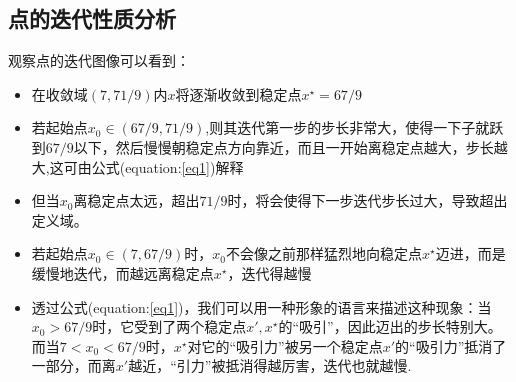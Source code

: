 \subsection*{点的迭代性质分析}
观察点的迭代图像可以看到：
\begin{itemize}
\item
在收敛域$(7,71/9)$内$x$将逐渐收敛到稳定点$x^{\star}=67/9$
\item
若起始点$x_0\in (67/9,71/9)$,则其迭代第一步的步长非常大，使得一下子就跃到$67/9$以下，然后慢慢朝稳定点方向靠近，而且一开始离稳定点越大，步长越大,这可由公式(equation:\ref{eq1})解释

\item
但当$x_0$离稳定点太远，超出$71/9$时，将会使得下一步迭代步长过大，导致超出定义域。

\item
若起始点$x_0\in (7,67/9)$时，$x_0$不会像之前那样猛烈地向稳定点$x^{\star}$迈进，而是缓慢地迭代，而越远离稳定点$x^{\star}$，迭代得越慢

\item
透过公式(equation:\ref{eq1})，我们可以用一种形象的语言来描述这种现象：当$x_0>67/9$时，它受到了两个稳定点$x',x^{\star}$的“吸引”，因此迈出的步长特别大。而当$7<x_0<67/9$时，$x^{\star}$对它的“吸引力”被另一个稳定点$x'$的“吸引力”抵消了一部分，而离$x'$越近，“引力”被抵消得越厉害，迭代也就越慢.
\end{itemize}







